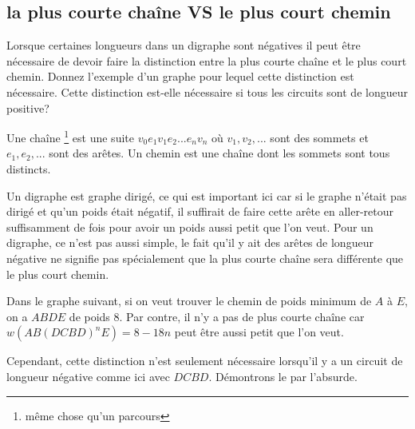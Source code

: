 \subsection{la plus courte chaîne VS le plus court chemin} Lorsque certaines longueurs dans un digraphe sont négatives il peut être nécessaire de devoir faire la distinction entre la plus courte chaîne et le plus court chemin. Donnez l'exemple d'un graphe pour lequel cette distinction est nécessaire. Cette distinction est-elle nécessaire si tous les circuits sont de longueur positive?
\begin{solution}
Une chaîne \footnote{même chose qu'un parcours} est une suite $v_0e_1v_1e_2...e_nv_n $ où $v_1,v_2,...$ sont des sommets et $e_1,e_2,...$ sont des arêtes.  Un chemin est une chaîne dont les sommets sont tous distincts.

Un digraphe est graphe dirigé, ce qui est important ici car si le graphe n'était pas dirigé et qu'un poids
était négatif, il suffirait de faire cette arête en aller-retour suffisamment de fois pour avoir un poids aussi petit que l'on veut.
Pour un digraphe, ce n'est pas aussi simple, le fait qu'il y ait des arêtes de longueur négative ne signifie pas spécialement que la plus courte chaîne sera différente que le plus court chemin.

  Dans le graphe suivant, si on veut trouver le chemin de poids minimum de $A$ à $E$, on a $ABDE$ de poids $8$.
  Par contre, il n'y a pas de plus courte chaîne car $w(AB(DCBD)^nE) = 8 - 18n$ peut être aussi
  petit que l'on veut.

  \begin{center}
  \end{center}

  Cependant, cette distinction n'est seulement nécessaire lorsqu'il y a
  un circuit de longueur négative comme ici avec $DCBD$.
  Démontrons le par l'absurde.\\


\end{solution}
